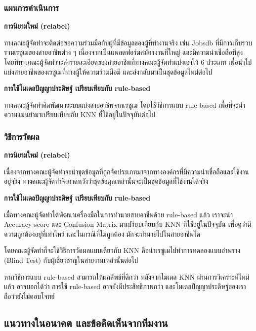 \subsubsection{แผนการดำเนินการ}
\textbf{การนิยามใหม่ (relabel)}

\par{
    ทางคณะผู้จัดทำจะติดต่อขอความร่วมมือกับผู้ที่มีข้อมูลของผู้ที่ทำงานจริง เช่น Jobsdb ที่มีการเก็บรวบรวมเรซูเมของสายอาชีพต่าง ๆ เนื่องจากเป็นแพลตฟอร์มสมัครงานที่ใหญ่ และมีความน่าเชือถือที่สูง โดยที่ทางคณะผู้จัดทำจะส่งรายละเอียดของสายอาชีพที่ทางคณะผู้จัดทำแบ่งเอาไว้ 6 ประเภท เพื่อนำไปแบ่งสายอาชีพของเรซูเมที่ทางผู้ให้ความร่วมมือมี และส่งกลับมาเป็นชุดข้อมูลใหม่ต่อไป
}

\textbf{การใช้โมเดลปัญญาประดิษฐ์ เปรียบเทียบกับ rule-based}

\par{
    ทางคณะผู้จัดทำคิดพัฒนาระบบแบ่งสายอาชีพจากเรซูเม โดยใช้วิธีการแบบ rule-based เพื่อที่จะนำความแม่นยำมาเปรียบเทียบกับ KNN ที่ใช้อยู่ในปัจจุบันต่อไป 
}

\subsubsection{วิธีการวัดผล}
\textbf{การนิยามใหม่ (relabel)}

\par{
    เนื่องจากทางคณะผู้จัดทำจะนำชุดข้อมูลที่ถูกจัดประเภทมาจากทางองค์กรที่มีความน่าเชื่อถือและใช้งานอยู่จริง ทางคณะผู้จัดทำจึงคาดหวังว่าชุดข้อมูลเหล่านั้นจะเป็นชุดข้อมูลที่ใช้งานได้จริง
}

\textbf{การใช้โมเดลปัญญาประดิษฐ์ เปรียบเทียบกับ rule-based}

\par{
    เมื่อทางคณะผู้จัดทำได้พัฒนาเครื่องมือในการทำนายสายอาชีพด้วย rule-based แล้ว เราจะนำ Accuracy score และ Confusion Matrix มาเปรียบเทียบกับ KNN ที่ใช้อยู่ในปัจจุบัน เพื่อดูว่ามีความถูกต้องอยู่ที่เท่าไหร่ และในกรณีที่ไม่ถูกต้อง มักจะทำนายไปในสายอาชีพใด
}

\par{
    โดยคณะผู้จัดทำก็จะใช้วิธีการวัดผลแบบเดียวกับ KNN คือนำเรซูเมไปทำการทดลองแบบอำพราง (Blind Test) กับผู้เชี่ยวชาญในสายงานเหล่านั้นต่อไป
}

\par{
    หากวิธีการแบบ rule-based สามารถให้ผลลัพธ์ที่ดีกว่า หลังจากโมเดล KNN ผ่านการวิเคราะห์ใหม่แล้ว อาจบอกได้ว่า การใช้ rule-based อาจยังมีประสิทธิภาพกว่า และโมเดลปัญญาประดิษฐ์ของเราถือว่ายังไม่ตอบโจทย์
}

\subsection{แนวทางในอนาคต และข้อคิดเห็นจากทีมงาน}

